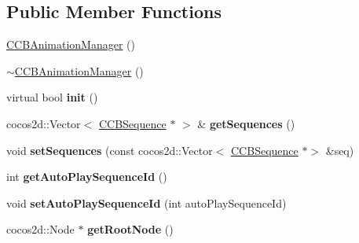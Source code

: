 \subsection*{Public Member Functions}
\begin{DoxyCompactItemize}
\item 
\hyperlink{classcocosbuilder_1_1CCBAnimationManager_ac17939919e77a76f71ccfd7717a2c074}{C\+C\+B\+Animation\+Manager} ()
\item 
\hyperlink{classcocosbuilder_1_1CCBAnimationManager_addcef172a3421b550b39f0056ccf72cc}{$\sim$\+C\+C\+B\+Animation\+Manager} ()
\item 
\mbox{\label{classcocosbuilder_1_1CCBAnimationManager_aea170163a73a47c82dd7cb622945b35d}} 
virtual bool {\bfseries init} ()
\item 
\mbox{\label{classcocosbuilder_1_1CCBAnimationManager_abc7644be0ff2c4e4da993dd626aa5185}} 
cocos2d\+::\+Vector$<$ \hyperlink{classcocosbuilder_1_1CCBSequence}{C\+C\+B\+Sequence} $\ast$ $>$ \& {\bfseries get\+Sequences} ()
\item 
\mbox{\label{classcocosbuilder_1_1CCBAnimationManager_aa18fcf3891bf58daa44e5ac44a79ee10}} 
void {\bfseries set\+Sequences} (const cocos2d\+::\+Vector$<$ \hyperlink{classcocosbuilder_1_1CCBSequence}{C\+C\+B\+Sequence} $\ast$$>$ \&seq)
\item 
\mbox{\label{classcocosbuilder_1_1CCBAnimationManager_abd121eb58c982b5664872e76367e515f}} 
int {\bfseries get\+Auto\+Play\+Sequence\+Id} ()
\item 
\mbox{\label{classcocosbuilder_1_1CCBAnimationManager_a4e429216cc38ccb933ff4c1529a18ead}} 
void {\bfseries set\+Auto\+Play\+Sequence\+Id} (int auto\+Play\+Sequence\+Id)
\item 
\mbox{\label{classcocosbuilder_1_1CCBAnimationManager_a5c5d46789f759c1ca29ba9333b79dcc1}} 
cocos2d\+::\+Node $\ast$ {\bfseries get\+Root\+Node} ()
\item 
\mbox{\label{classcocosbuilder_1_1CCBAnimationManager_a777256d63e57f12146d93b38ea0847a9}} 
$$
\end{DoxyCompactItemize}
